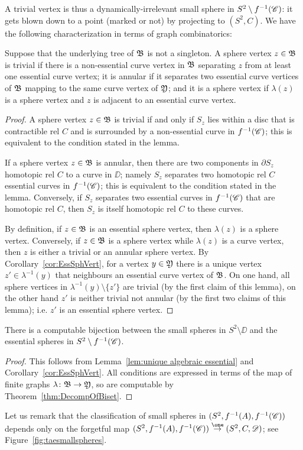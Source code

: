 \documentclass{amsart}
\begin{document}
\noindent A trivial vertex is thus a dynamically-irrelevant small
sphere in $S^2\setminus f^{-1}({\mathscr C})$: it gets blown down to a point
(marked or not) by projecting to $(S^2,C)$. We have the following
characterization in terms of graph combinatorics:
\begin{lem}\label{lem:unique algebraic essential}
  Suppose that the underlying tree of ${\mathfrak B}$ is not a
  singleton. A sphere vertex $z\in {\mathfrak B}$ is trivial if there is
  a non-essential curve vertex in ${\mathfrak B}$ separating $z$ from at
  least one essential curve vertex; it is annular if it separates two
  essential curve vertices of ${\mathfrak B}$ mapping to the same curve
  vertex of ${\mathfrak Y}$; and it is a sphere vertex if $\lambda(z)$
  is a sphere vertex and $z$ is adjacent to an essential curve vertex.
\end{lem}
\begin{proof}
  A sphere vertex $z\in {\mathfrak B}$ is trivial if and only if $S_z$
  lies within a disc that is contractible rel $C$ and is surrounded by
  a non-essential curve in $f^ {-1}({\mathscr C})$; this is equivalent to the
  condition stated in the lemma.

  If a sphere vertex $z\in {\mathfrak B}$ is annular, then there are two
  components in $\partial S_z$ homotopic rel $C$ to a curve in $\DD$;
  namely $S_z$ separates two homotopic rel $C$ essential curves in
  $f^ {-1}({\mathscr C})$; this is equivalent to the condition stated in the
  lemma. Conversely, if $S_z$ separates two essential curves in
  $f^ {-1}({\mathscr C})$ that are homotopic rel $C$, then $S_z$ is itself
  homotopic rel $C$ to these curves.

  By definition, if $z\in {\mathfrak B}$ is an essential sphere vertex,
  then $\lambda(z)$ is a sphere vertex. Conversely, if
  $z\in {\mathfrak B}$ is a sphere vertex while $\lambda(z)$ is a curve
  vertex, then $z$ is either a trivial or an annular sphere vertex. By
  Corollary~\ref{cor:EssSphVert}, for a vertex $y\in {\mathfrak Y}$
  there is a unique vertex $z'\in \lambda^{-1}(y)$ that neighbours an
  essential curve vertex of ${\mathfrak B}$. On one hand, all sphere
  vertices in $\lambda^{-1}(y)\setminus \{z'\}$ are trivial (by the
  first claim of this lemma), on the other hand $z'$ is neither
  trivial not annular (by the first two claims of this lemma);
  i.e. $z'$ is an essential sphere vertex.
\end{proof}

\begin{cor}\label{cor:unique essential}
  There is a computable bijection between the small spheres in
  $S^2\setminus\DD$ and the essential spheres in
  $S^2\setminus f^{-1}({\mathscr C})$.
\end{cor}
\begin{proof}
  This follows from Lemma~\ref{lem:unique algebraic essential} and
  Corollary~\ref{cor:EssSphVert}. All conditions are expressed in
  terms of the map of finite graphs $\lambda\colon{\mathfrak B}\to{\mathfrak Y}$, so are
  computable by Theorem~\ref{thm:DecompOfBiset}.
\end{proof}
\noindent Let us remark that the classification of small spheres in
$(S^2,f^{-1}(A), f^{-1}({\mathscr C}))$ depends only on the forgetful map
$(S^2,f^{-1}(A), f^{-1}(\CC))\overset{\one}\rightarrow (S^2,C,\DD)$;
see Figure~\ref{fig:taesmallspheres}.
\end{document}
